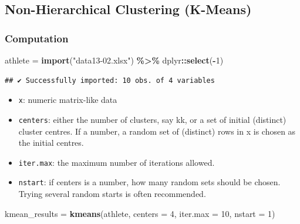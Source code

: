 \documentclass[
]{ctexart}
\newenvironment{Shaded}{\begin{snugshade}}{\end{snugshade}}
\newcommand{\AttributeTok}[1]{\textcolor[rgb]{0.13,0.29,0.53}{#1}}
\newcommand{\DecValTok}[1]{\textcolor[rgb]{0.00,0.00,0.81}{#1}}
\newcommand{\FunctionTok}[1]{\textcolor[rgb]{0.13,0.29,0.53}{\textbf{#1}}}
\newcommand{\NormalTok}[1]{#1}
\newcommand{\OtherTok}[1]{\textcolor[rgb]{0.56,0.35,0.01}{#1}}
\newcommand{\SpecialCharTok}[1]{\textcolor[rgb]{0.81,0.36,0.00}{\textbf{#1}}}
\newcommand{\StringTok}[1]{\textcolor[rgb]{0.31,0.60,0.02}{#1}}
\providecommand{\tightlist}{%
  \setlength{\itemsep}{0pt}\setlength{\parskip}{0pt}}
\begin{document}
\hypertarget{non-hierarchical-clustering-k-means}{%
\subsection{Non-Hierarchical Clustering
(K-Means)}\label{non-hierarchical-clustering-k-means}}

\hypertarget{computation}{%
\subsubsection{Computation}\label{computation}}

\begin{Shaded}
\begin{Highlighting}[]
\NormalTok{athlete }\OtherTok{=} \FunctionTok{import}\NormalTok{(}\StringTok{"data13{-}02.xlsx"}\NormalTok{) }\SpecialCharTok{\%\textgreater{}\%}\NormalTok{ dplyr}\SpecialCharTok{::}\FunctionTok{select}\NormalTok{(}\SpecialCharTok{{-}}\DecValTok{1}\NormalTok{)}
\end{Highlighting}
\end{Shaded}

\begin{verbatim}
## ✔ Successfully imported: 10 obs. of 4 variables
\end{verbatim}

\begin{itemize}
\tightlist
\item
  \texttt{x}: numeric matrix-like data
\item
  \texttt{centers}: either the number of clusters, say kk, or a set of
  initial (distinct) cluster centres. If a number, a random set of
  (distinct) rows in x is chosen as the initial centres.
\item
  \texttt{iter.max}: the maximum number of iterations allowed.
\item
  \texttt{nstart}: if centers is a number, how many random sets should
  be chosen. Trying several random starts is often recommended.
\end{itemize}

\begin{Shaded}
\begin{Highlighting}[]
\NormalTok{kmean\_results }\OtherTok{=} \FunctionTok{kmeans}\NormalTok{(athlete, }\AttributeTok{centers =} \DecValTok{4}\NormalTok{, }
                       \AttributeTok{iter.max =} \DecValTok{10}\NormalTok{, }\AttributeTok{nstart =} \DecValTok{1}\NormalTok{)}
\end{Highlighting}
\end{Shaded}
\end{document}
